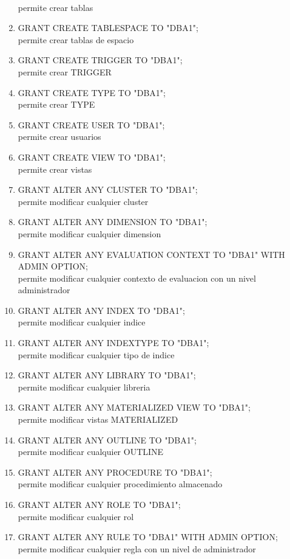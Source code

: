 \begin{enumerate}
\\permite crear tablas
\item GRANT CREATE TABLESPACE TO "DBA1";
\\permite crear tablas de espacio
\item GRANT CREATE TRIGGER TO "DBA1";
\\permite crear TRIGGER
\item GRANT CREATE TYPE TO "DBA1";
\\permite crear TYPE
\item GRANT CREATE USER TO "DBA1";
\\permite crear usuarios
\item GRANT CREATE VIEW TO "DBA1";
\\permite crear vistas
\item GRANT ALTER ANY CLUSTER TO "DBA1";
\\permite modificar cualquier cluster
\item GRANT ALTER ANY DIMENSION TO "DBA1";
\\permite modificar cualquier dimension
\item GRANT ALTER ANY EVALUATION CONTEXT TO "DBA1" WITH ADMIN OPTION;
\\permite modificar cualquier contexto de evaluacion con un nivel administrador
\item GRANT ALTER ANY INDEX TO "DBA1";
\\permite modificar cualquier indice
\item GRANT ALTER ANY INDEXTYPE TO "DBA1";
\\permite modificar cualquier tipo de indice
\item GRANT ALTER ANY LIBRARY TO "DBA1";
\\permite modificar cualquier libreria
\item GRANT ALTER ANY MATERIALIZED VIEW TO "DBA1";
\\permite modificar vistas MATERIALIZED
\item GRANT ALTER ANY OUTLINE TO "DBA1";
\\permite modificar cualquier OUTLINE
\item GRANT ALTER ANY PROCEDURE TO "DBA1";
\\permite modificar cualquier procedimiento almacenado
\item GRANT ALTER ANY ROLE TO "DBA1";
\\permite modificar cualquier rol
\item GRANT ALTER ANY RULE TO "DBA1" WITH ADMIN OPTION;
\\permite modificar cualquier regla con un nivel de administrador

\end{enumerate}
